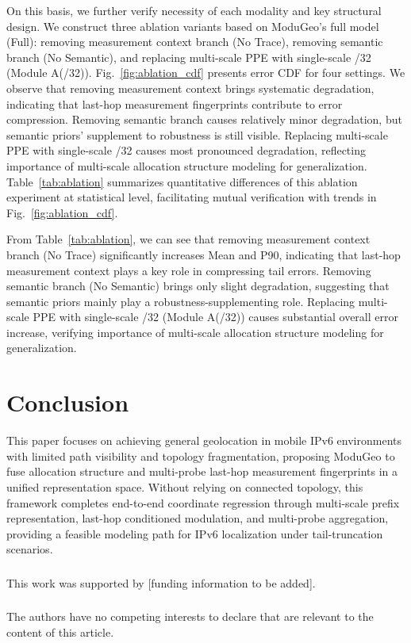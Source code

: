 \documentclass[runningheads]{llncs}
\begin{document}
On this basis, we further verify necessity of each modality and key structural design. We construct three ablation variants based on ModuGeo's full model (Full): removing measurement context branch (No Trace), removing semantic branch (No Semantic), and replacing multi-scale PPE with single-scale /32 (Module A(/32)). Fig.~\ref{fig:ablation_cdf} presents error CDF for four settings. We observe that removing measurement context brings systematic degradation, indicating that last-hop measurement fingerprints contribute to error compression. Removing semantic branch causes relatively minor degradation, but semantic priors' supplement to robustness is still visible. Replacing multi-scale PPE with single-scale /32 causes most pronounced degradation, reflecting importance of multi-scale allocation structure modeling for generalization. Table~\ref{tab:ablation} summarizes quantitative differences of this ablation experiment at statistical level, facilitating mutual verification with trends in Fig.~\ref{fig:ablation_cdf}.

From Table~\ref{tab:ablation}, we can see that removing measurement context branch (No Trace) significantly increases Mean and P90, indicating that last-hop measurement context plays a key role in compressing tail errors. Removing semantic branch (No Semantic) brings only slight degradation, suggesting that semantic priors mainly play a robustness-supplementing role. Replacing multi-scale PPE with single-scale /32 (Module A(/32)) causes substantial overall error increase, verifying importance of multi-scale allocation structure modeling for generalization.

\section{Conclusion}

This paper focuses on achieving general geolocation in mobile IPv6 environments with limited path visibility and topology fragmentation, proposing ModuGeo to fuse allocation structure and multi-probe last-hop measurement fingerprints in a unified representation space. Without relying on connected topology, this framework completes end-to-end coordinate regression through multi-scale prefix representation, last-hop conditioned modulation, and multi-probe aggregation, providing a feasible modeling path for IPv6 localization under tail-truncation scenarios.

\begin{credits}
\subsubsection{\ackname}
This work was supported by [funding information to be added].

\subsubsection{\discintname}
The authors have no competing interests to declare that are relevant to the content of this article.
\end{credits}

%
%


\end{document}
